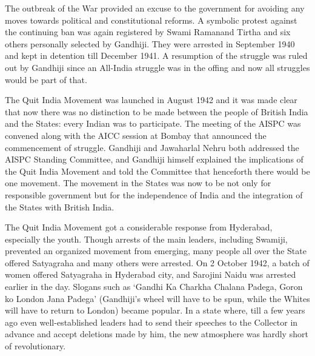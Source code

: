 \begin{multicols}{2}
The outbreak of the War provided an excuse to the government for avoiding any moves towards political and constitutional reforms. A symbolic protest against the continuing ban was again registered by Swami Ramanand Tirtha and six others personally selected by Gandhiji. They were arrested in September 1940 and kept in detention till December 1941. A resumption of the struggle was ruled out by Gandhiji since an All-India struggle was in the offing and now all struggles would be part of that. 

The Quit India Movement was launched in August 1942 and it was made clear that now there was no distinction to be made between the people of British India and the States: every Indian was to participate. The meeting of the AISPC was convened along with the AICC session at Bombay that announced the commencement of struggle. Gandhiji and Jawaharlal Nehru both addressed the AISPC Standing Committee, and Gandhiji himself explained the implications of the Quit India Movement and told the Committee that henceforth there would be one movement. The movement in the States was now to be not only for responsible government but for the independence of India and the integration of the States with British India. 

The Quit India Movement got a considerable response from Hyderabad, especially the youth. Though arrests of the main leaders, including Swamiji, prevented an organized movement from emerging, many people all over the State offered Satyagraha and many others were arrested. On 2 October 1942, a batch of women offered Satyagraha in Hyderabad city, and Sarojini Naidu was arrested earlier in the day. Slogans such as `Gandhi Ka Charkha Chalana Padega, Goron ko London Jana Padega' (Gandhiji's wheel will have to be spun, while the Whites will have to return to London) became popular. In a state where, till a few years ago even well-established leaders had to send their speeches to the Collector in advance and accept deletions made by him, the new atmosphere was hardly short of revolutionary. 


\end{multicols}
